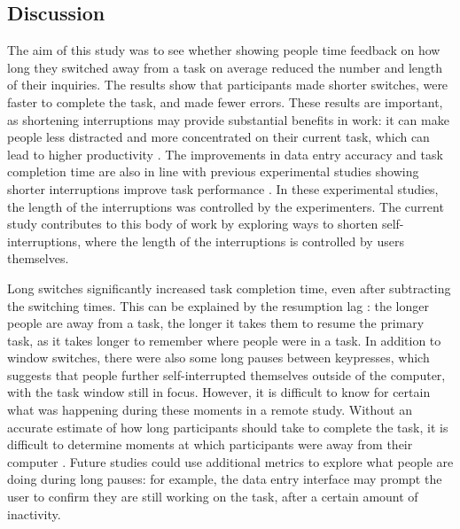 \subsection{Discussion}
The aim of this study was to see whether showing people time feedback on how long they switched away from a task on average reduced the number and length of their inquiries. The results show that participants made shorter switches, were faster to complete the task, and made fewer errors. These results are important, as shortening interruptions may provide substantial benefits in work: it can make people less distracted and more concentrated on their current task, which can lead to higher productivity \citep{Iqbal2010, Mark2018}. The improvements in data entry accuracy and task completion time are also in line with previous experimental studies showing shorter interruptions improve task performance \citep{Altmann2017, Monk2008}. In these experimental studies, the length of the interruptions was controlled by the experimenters. The current study contributes to this body of work by exploring ways to shorten self-interruptions, where the length of the interruptions is controlled by users themselves.

Long switches significantly increased task completion time, even after subtracting the switching times. This can be explained by the resumption lag \citep{Altmann2004}: the longer people are away from a task, the longer it takes them to resume the primary task, as it takes longer to remember where people were in a task.
In addition to window switches, there were also some long pauses between keypresses, which suggests that people further self-interrupted themselves outside of the computer, with the task window still in focus. However, it is difficult to know for certain what was happening during these moments in a remote study. Without an accurate estimate of how long participants should take to complete the task, it is difficult to determine moments at which participants were away from their computer \citep{Rzeszotarski2013}. Future studies could use additional metrics to explore what people are doing during long pauses: for example, the data entry interface may prompt the user to confirm they are still working on the task, after a certain amount of inactivity.

